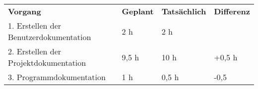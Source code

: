 \begin{tabular}{llll}
\rowcolor{heading}\textbf{Vorgang} & \textbf{Geplant} & \textbf{Tatsächlich} & \textbf{Differenz} \\
1. Erstellen der Benutzerdokumentation & 2 h   & 2 h   &  \\
\rowcolor{odd}2. Erstellen der Projektdokumentation & 9,5 h   & 10 h   & +0,5 h \\
3. Programmdokumentation & 1 h   & 0,5 h  & -0,5  \\
\end{tabular}
